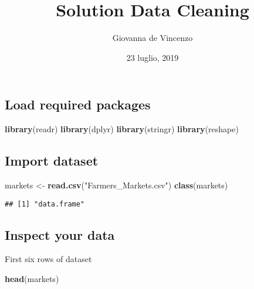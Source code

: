 \documentclass[]{article}
\title{Solution Data Cleaning}
\author{Giovanna de Vincenzo}
\date{23 luglio, 2019}
\newenvironment{Shaded}{\begin{snugshade}}{\end{snugshade}}
\newcommand{\KeywordTok}[1]{\textcolor[rgb]{0.13,0.29,0.53}{\textbf{#1}}}
\newcommand{\StringTok}[1]{\textcolor[rgb]{0.31,0.60,0.02}{#1}}
\newcommand{\NormalTok}[1]{#1}
\begin{document}
\maketitle

{
\setcounter{tocdepth}{2}
\tableofcontents
}
\subsection{Load required packages}\label{load-required-packages}

\begin{Shaded}
\begin{Highlighting}[]
\KeywordTok{library}\NormalTok{(readr)}
\KeywordTok{library}\NormalTok{(dplyr)}
\KeywordTok{library}\NormalTok{(stringr)}
\KeywordTok{library}\NormalTok{(reshape)}
\end{Highlighting}
\end{Shaded}

\subsection{Import dataset}\label{import-dataset}

\begin{Shaded}
\begin{Highlighting}[]
\NormalTok{markets <-}\StringTok{ }\KeywordTok{read.csv}\NormalTok{(}\StringTok{"Farmers_Markets.csv"}\NormalTok{)}
\KeywordTok{class}\NormalTok{(markets) }
\end{Highlighting}
\end{Shaded}

\begin{verbatim}
## [1] "data.frame"
\end{verbatim}

\subsection{Inspect your data}\label{inspect-your-data}

First six rows of dataset

\begin{Shaded}
\begin{Highlighting}[]
\KeywordTok{head}\NormalTok{(markets)}
\end{Highlighting}
\end{Shaded}
\end{document}
